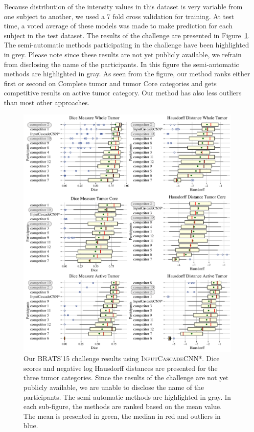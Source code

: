 \documentclass[final,5p,times,twocolumn]{elsarticle}
\begin{document}
{Because distribution of the intensity values in this dataset is very variable from one subject to another, we used a 7 fold cross validation for training. At test time, a voted average of these models was made to make prediction for each subject in the test dataset. The results of the challenge are presented in Figure~\ref{fig:brats15_results}. The semi-automatic methods participating in the challenge have been highlighted in grey. Please note since these results are not yet publicly available, we refrain from disclosing the name of the participants. In this figure the semi-automatic methods are highlighted in gray. As seen from the figure, our method ranks either first or second on Complete tumor and tumor Core categories and gets competitive results on active tumor category.  Our method has also less outliers than most other approaches.

\begin{figure}[t]
\centering

\includegraphics[width=0.98\linewidth]{Brats15_plotbox.pdf}

\caption{Our BRATS'15 challenge results using \textsc{InputCascadeCNN*}. Dice scores and negative log Hausdorff distances are presented for the three tumor categories. Since the results of the challenge are not yet publicly available, we are unable to disclose the name of the participants. The semi-automatic methods are highlighted in gray. In each sub-figure, the methods are ranked based on the mean value. The mean is presented in green, the median in red and outliers in blue.}
\label{fig:brats15_results}
\end{figure} 


}
\end{document}

